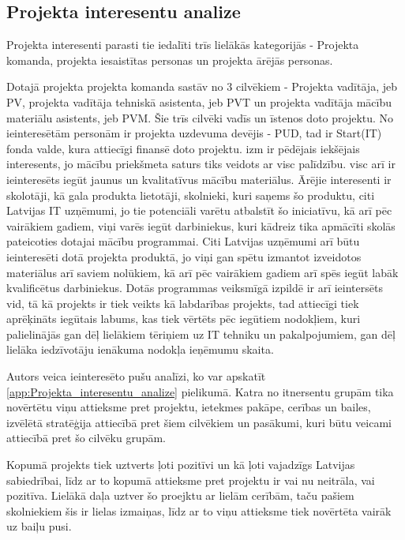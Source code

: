 \subsection{Projekta interesentu analize}
Projekta interesenti parasti tie iedalīti trīs lielākās kategorijās -
Projekta komanda, projekta iesaistītas personas un projekta ārējās personas.
\par
Dotajā projekta projekta komanda sastāv no 3 cilvēkiem - Projekta vadītāja, jeb PV,
projekta vadītāja tehniskā asistenta, jeb PVT un projekta vadītāja mācību materiālu
asistents, jeb PVM. Šie trīs cilvēki vadīs un īstenos doto projektu. No ieinteresētām
personām ir projekta uzdevuma devējis - PUD, tad ir Start(IT) fonda valde, kura
attiecīgi finansē doto projektu. \acrshort{izm} ir pēdējais iekšējais interesents, jo 
mācību priekšmeta saturs tiks veidots ar \acrshort{visc} palīdzību. \acrshort{visc} arī 
ir ieinteresēts iegūt jaunus un kvalitatīvus mācību materiālus. Ārējie interesenti ir
skolotāji, kā gala produkta lietotāji, skolnieki, kuri saņems šo produktu, citi Latvijas IT uzņēmumi,
jo tie potenciāli varētu atbalstīt šo iniciatīvu, kā arī pēc vairākiem gadiem, viņi varēs iegūt darbiniekus,
kuri kādreiz tika apmācīti skolās pateicoties dotajai mācību programmai. Citi Latvijas 
uzņēmumi arī būtu ieinteresēti dotā projekta produktā, jo viņi gan spētu izmantot izveidotos
materiālus arī saviem nolūkiem, kā arī pēc vairākiem gadiem arī spēs iegūt labāk kvalificētus
darbiniekus. Dotās programmas veiksmīgā izpildē ir arī ieintersēts \acrshort{vid}, tā kā projekts ir
tiek veikts kā labdarības projekts, tad attiecīgi tiek aprēķināts iegūtais labums, kas tiek vērtēts
pēc iegūtiem nodokļiem, kuri palielinājās gan dēļ lielākiem tēriņiem uz IT tehniku un pakalpojumiem,
gan dēļ lielāka iedzīvotāju ienākuma nodokļa ieņēmumu skaita.
\par
\par
Autors veica ieinteresēto pušu analīzi, ko var apskatīt \ref{app:Projekta_interesentu_analize} pielikumā.
Katra no itnersentu grupām tika novērtētu viņu attieksme pret projektu, ietekmes pakāpe, cerības un bailes,
izvēlētā stratēģija attiecībā pret šiem cilvēkiem un pasākumi, kuri būtu veicami attiecībā pret šo cilvēku
grupām.
\par 
Kopumā projekts tiek uztverts ļoti pozitīvi un kā ļoti vajadzīgs Latvijas sabiedrībai, līdz ar to kopumā
attieksme pret projektu ir vai nu neitrāla, vai pozitīva. Lielākā daļa uztver šo proejktu ar lielām cerībām,
taču pašiem skolniekiem šis ir lielas izmaiņas, līdz ar to viņu attieksme tiek novērtēta vairāk uz baiļu pusi.
